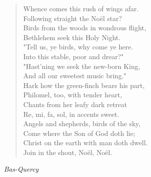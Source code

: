 
\begin{verse}
Whence comes this rush of wings afar.\\
Following straight the Noël star?\\
Birds from the woods in wondrous flight,\\
Bethlehem seek this Holy Night.\\[0.7em]

"Tell us, ye birds, why come ye here.\\
Into this stable, poor and drear?"\\
"Hast'ning we seek the new-born King,\\
And all our sweetest music bring."\\[0.7em]

Hark how the green-finch bears his part,\\
Philomel, too, with tender heart,\\
Chants from her leafy dark retreat\\
Re, mi, fa, sol, in accents sweet.\\[0.7em]

Angels and shepherds, birds of the sky,\\
Come where the Son of God doth lie;\\
Christ on the earth with man doth dwell.\\
Join in the shout, Noël, Noël.%
\end{verse}

\vspace{0.5\baselineskip}
\noindent\textit{Bas-Quercy}

\newpage
